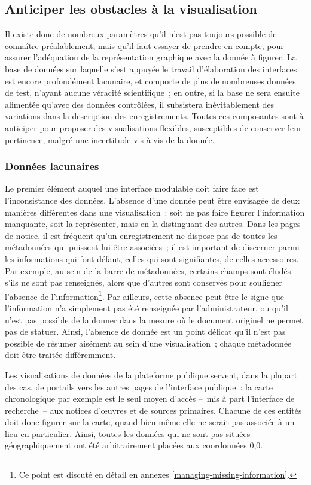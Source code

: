 \documentclass[a4paper,12pt,twoside]{book}
\newcommand{\bdd}{base de données\xspace}
\begin{document}
		\subsection{Anticiper les obstacles à la visualisation}
Il existe donc de nombreux paramètres qu'il n'est pas toujours possible de connaître préalablement, mais qu'il faut essayer de prendre en compte, pour assurer l'adéquation de la représentation graphique avec la donnée à figurer. La \bdd sur laquelle s'est appuyée le travail d'élaboration des interfaces est encore profondément lacunaire, et comporte de plus de nombreuses données de test, n'ayant aucune véracité scientifique~; en outre, si la base ne sera ensuite alimentée qu'avec des données contrôlées, il subsistera inévitablement des variations dans la description des enregistrements. Toutes ces composantes sont à anticiper pour proposer des visualisations flexibles, susceptibles de conserver leur pertinence, malgré une incertitude vis-à-vis de la donnée.

			\subsubsection{Données lacunaires}
Le premier élément auquel une interface modulable doit faire face est l'inconsistance des données. L'absence d'une donnée peut être envisagée de deux manières différentes dans une visualisation~: soit ne pas faire figurer l'information manquante, soit la représenter, mais en la distinguant des autres. Dans les pages de notice, il est fréquent qu'un enregistrement ne dispose pas de toutes les métadonnées qui puissent lui être associées~; il est important de discerner parmi les informations qui font défaut, celles qui sont signifiantes, de celles accessoires. Par exemple, au sein de la barre de métadonnées, certains champs sont éludés s'ils ne sont pas renseignés, alors que d'autres sont conservés pour souligner l'absence de l'information\footnote{Ce point est discuté en détail en annexes \ref{managing-missing-information}.}. Par ailleurs, cette absence peut être le signe que l'information n'a simplement pas été renseignée par l'administrateur, ou qu'il n'est pas possible de la donner dans la mesure où le document originel ne permet pas de statuer. Ainsi, l'absence de donnée est un point délicat qu'il n'est pas possible de résumer aisément au sein d'une visualisation~; chaque métadonnée doit être traitée différemment.

Les visualisations de données de la plateforme publique servent, dans la plupart des cas, de portails vers les autres pages de l'interface publique~: la carte chronologique par exemple est le seul moyen d'accès –~mis à part l'interface de recherche~– aux notices d'œuvres et de sources primaires. Chacune de ces entités doit donc figurer sur la carte, quand bien même elle ne serait pas associée à un lieu en particulier. Ainsi, toutes les données qui ne sont pas situées géographiquement ont été arbitrairement placées aux coordonnées 0,0.
\end{document}
